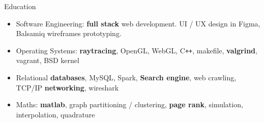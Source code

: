 \documentclass{cv} %
\def\titlelistvspace{-0.15cm}
\begin{document}
\begin{rSection}{Education}
    \vspace{\titlelistvspace}\begin{itemize}
        \itemsep -3pt {}
        \item Software Engineering: \textbf{full stack} web development.
              UI / UX design in Figma, Balsamiq wireframes prototyping.
        \item Operating Systems:
              \textbf{raytracing},
              OpenGL,
              WebGL,
              C\texttt{++},
              makefile,
              \textbf{valgrind},
              vagrant,
              BSD kernel
        \item Relational \textbf{databases},
              MySQL,
              Spark,
              \textbf{Search engine},
              web crawling,
              TCP/IP \textbf{networking},
              wireshark
        \item Maths:
              \textbf{matlab},
              graph partitioning / clustering,
              \textbf{page rank},
              simulation,
              interpolation,
              quadrature


\end{itemize}
\end{rSection}
\end{document}
